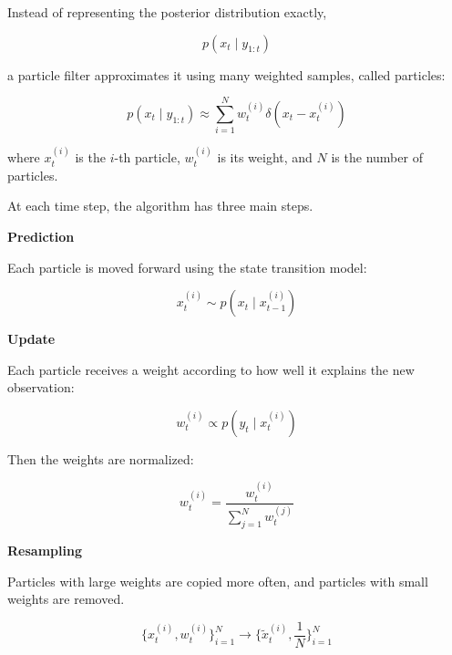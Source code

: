 \documentclass{book}
\providecommand{\ProjectDeepHeading}[2]{%
    \par\medskip\noindent\textbf{#2}\par\smallskip
}
\begin{document}
    Instead of representing the posterior distribution exactly,
    
    \begin{equation}
        p(x_t \mid y_{1:t})
    \end{equation}
    
    a particle filter approximates it using many weighted samples, called particles:
    
    \begin{equation}
        p(x_t \mid y_{1:t}) \approx \sum_{i=1}^{N} w_t^{(i)} \ensuremath{\delta}(x_t - x_t^{(i)})
    \end{equation}
    
    where $x_t^{(i)}$ is the $i$-th particle, $w_t^{(i)}$ is its weight, and $N$ is the number of particles.
    
    At each time step, the algorithm has three main steps.
    
    
    \ProjectDeepHeading{10}{Prediction}
        
        Each particle is moved forward using the state transition model:
        
        \begin{equation}
            x_t^{(i)} \sim p(x_t \mid x_{t-1}^{(i)})
        \end{equation}
    
    
    \ProjectDeepHeading{10}{Update}
        
        Each particle receives a weight according to how well it explains the new observation:
        
        \begin{equation}
            w_t^{(i)} \propto p(y_t \mid x_t^{(i)})
        \end{equation}
        
        Then the weights are normalized:
        
        \begin{equation}
            w_t^{(i)} =
            \frac{w_t^{(i)}}{\sum_{j=1}^{N} w_t^{(j)}}
        \end{equation}
    
    
    \ProjectDeepHeading{10}{Resampling}
        
        Particles with large weights are copied more often, and particles with small weights are removed.
        
        \begin{equation}
            \{x_t^{(i)}, w_t^{(i)}\}_{i=1}^{N}
            \rightarrow
            \{\tilde{x}_t^{(i)}, \frac{1}{N}\}_{i=1}^{N}
        \end{equation}
        
\end{document}
